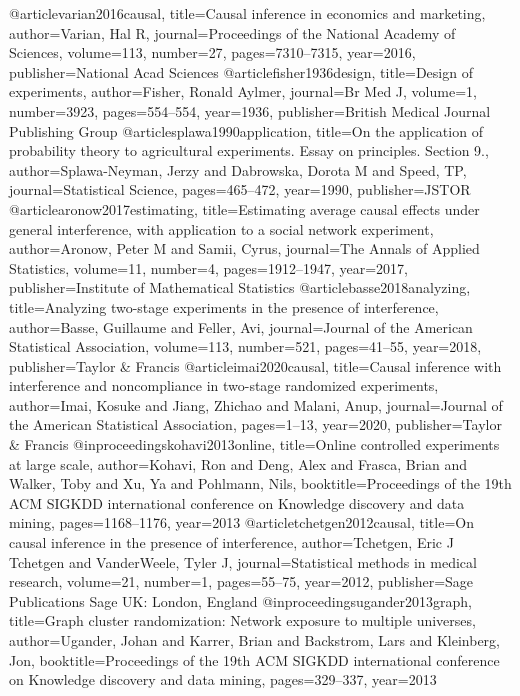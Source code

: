 @article{varian2016causal,
  title={Causal inference in economics and marketing},
  author={Varian, Hal R},
  journal={Proceedings of the National Academy of Sciences},
  volume={113},
  number={27},
  pages={7310--7315},
  year={2016},
  publisher={National Acad Sciences}
}
@article{fisher1936design,
  title={Design of experiments},
  author={Fisher, Ronald Aylmer},
  journal={Br Med J},
  volume={1},
  number={3923},
  pages={554--554},
  year={1936},
  publisher={British Medical Journal Publishing Group}
}
@article{splawa1990application,
  title={On the application of probability theory to agricultural experiments. Essay on principles. Section 9.},
  author={Splawa-Neyman, Jerzy and Dabrowska, Dorota M and Speed, TP},
  journal={Statistical Science},
  pages={465--472},
  year={1990},
  publisher={JSTOR}
}
@article{aronow2017estimating,
  title={Estimating average causal effects under general interference, with application to a social network experiment},
  author={Aronow, Peter M and Samii, Cyrus},
  journal={The Annals of Applied Statistics},
  volume={11},
  number={4},
  pages={1912--1947},
  year={2017},
  publisher={Institute of Mathematical Statistics}
}
@article{basse2018analyzing,
  title={Analyzing two-stage experiments in the presence of interference},
  author={Basse, Guillaume and Feller, Avi},
  journal={Journal of the American Statistical Association},
  volume={113},
  number={521},
  pages={41--55},
  year={2018},
  publisher={Taylor \& Francis}
}
@article{imai2020causal,
  title={Causal inference with interference and noncompliance in two-stage randomized experiments},
  author={Imai, Kosuke and Jiang, Zhichao and Malani, Anup},
  journal={Journal of the American Statistical Association},
  pages={1--13},
  year={2020},
  publisher={Taylor \& Francis}
}
@inproceedings{kohavi2013online,
  title={Online controlled experiments at large scale},
  author={Kohavi, Ron and Deng, Alex and Frasca, Brian and Walker, Toby and Xu, Ya and Pohlmann, Nils},
  booktitle={Proceedings of the 19th ACM SIGKDD international conference on Knowledge discovery and data mining},
  pages={1168--1176},
  year={2013}
}
@article{tchetgen2012causal,
  title={On causal inference in the presence of interference},
  author={Tchetgen, Eric J Tchetgen and VanderWeele, Tyler J},
  journal={Statistical methods in medical research},
  volume={21},
  number={1},
  pages={55--75},
  year={2012},
  publisher={Sage Publications Sage UK: London, England}
}
@inproceedings{ugander2013graph,
  title={Graph cluster randomization: Network exposure to multiple universes},
  author={Ugander, Johan and Karrer, Brian and Backstrom, Lars and Kleinberg, Jon},
  booktitle={Proceedings of the 19th ACM SIGKDD international conference on Knowledge discovery and data mining},
  pages={329--337},
  year={2013}
}
